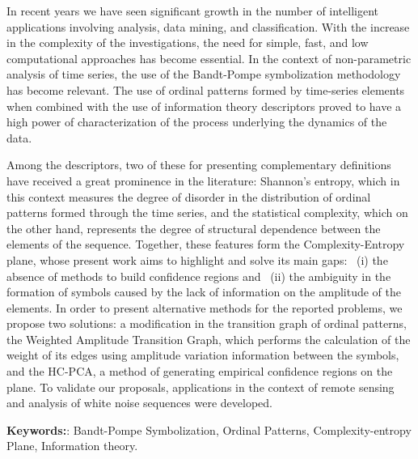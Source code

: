 In recent years we have seen significant growth in the number of intelligent applications involving analysis, data mining, and classification.
With the increase in the complexity of the investigations, the need for simple, fast, and low computational approaches has become essential.
In the context of non-parametric analysis of time series, the use of the Bandt-Pompe symbolization methodology has become relevant.
The use of ordinal patterns formed by time-series elements when combined with the use of information theory descriptors proved to have a high power of characterization of the process underlying the dynamics of the data.

Among the descriptors, two of these for presenting complementary definitions have received a great prominence in the literature: Shannon's entropy, which in this context measures the degree of disorder in the distribution of ordinal patterns formed through the time series, and the statistical complexity, which on the other hand, represents the degree of structural dependence between the elements of the sequence.
Together, these features form the Complexity-Entropy plane, whose present work aims to highlight and solve its main gaps:
~(i) the absence of methods to build confidence regions and 
~(ii) the ambiguity in the formation of symbols caused by the lack of information on the amplitude of the elements.
In order to present alternative methods for the reported problems, we propose two solutions: a modification in the transition graph of ordinal patterns, the Weighted Amplitude Transition Graph, which performs the calculation of the weight of its edges using amplitude variation information between the symbols, and the HC-PCA, a method of generating empirical confidence regions on the plane.
To validate our proposals, applications in the context of remote sensing and analysis of white noise sequences were developed.

\textbf{Keywords:}: Bandt-Pompe Symbolization, Ordinal Patterns, Complexity-entropy Plane, Information theory.
